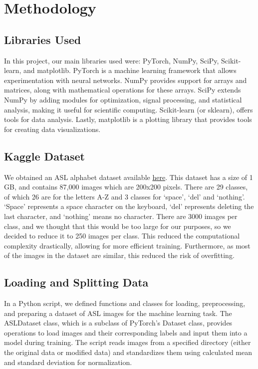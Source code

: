 \documentclass[10pt,twocolumn,letterpaper]{article}
\begin{document}
\section{Methodology}

\subsection{Libraries Used}
In this project, our main libraries used were: PyTorch, NumPy,
SciPy, Scikit-learn, and matplotlib. PyTorch is a machine learning 
framework that allows experimentation with neural networks. 
NumPy provides support for arrays and matrices, along with
mathematical operations for these arrays. SciPy extends
NumPy by adding modules for optimization, signal processing,
and statistical analysis, making it useful for scientific 
computing. Scikit-learn (or sklearn), offers tools for data 
analysis. Lastly, matplotlib is a plotting library that 
provides tools for creating data visualizations.


\subsection{Kaggle Dataset}
We obtained an ASL alphabet dataset available \href{https://www.kaggle.com/datasets/grassknoted/asl-alphabet}{here}.
This dataset has a size of 1 GB, and contains 87,000 images which are 200x200 pixels. There are 29 classes,
of which 26 are for the letters A-Z and 3 classes for ‘space’, ‘del’ and ‘nothing’. ‘Space’ represents
a space character on the keyboard, ‘del’ represents deleting the last character, and ‘nothing’ means
no character. There are 3000 images per class, and we thought that this would be too large for our
purposes, so we decided to reduce it to 250 images per class. This reduced the computational 
complexity drastically, allowing for more efficient training. Furthermore, as most of the images
in the dataset are similar, this reduced the risk of overfitting. 

\subsection{Loading and Splitting Data}

In a Python script, we defined functions and classes for loading, preprocessing, and preparing
a dataset of ASL images for the machine learning task. The ASLDataset class, which
is a subclass of PyTorch's Dataset class, provides operations to load images and
their corresponding labels and input them into a model during training. The 
script reads images from a specified directory (either the original data or modified data)
and standardizes them using calculated mean and standard deviation for normalization.
\end{document}

